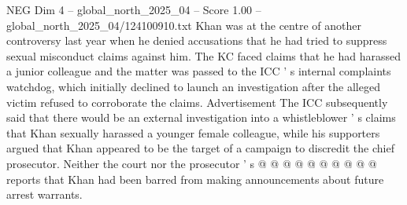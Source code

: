 \begin{textsample}{NEG Dim 4 – global\_north\_2025\_04 – Score 1.00 – global\_north\_2025\_04/124100910.txt}
Khan was at the centre of another controversy last year when he denied accusations that he had tried to suppress sexual misconduct claims against him.
The KC faced claims that he had harassed a junior colleague and the matter was passed to the ICC ' s internal complaints watchdog, which initially declined to launch an investigation after the alleged victim refused to corroborate the claims.
Advertisement The ICC subsequently said that there would be an external investigation into a whistleblower ' s claims that Khan sexually harassed a younger female colleague, while his supporters argued that Khan appeared to be the target of a campaign to discredit the chief prosecutor.
Neither the court nor the prosecutor ' s @ @ @ @ @ @ @ @ @ @ reports that Khan had been barred from making announcements about future arrest warrants.

\end{textsample}
